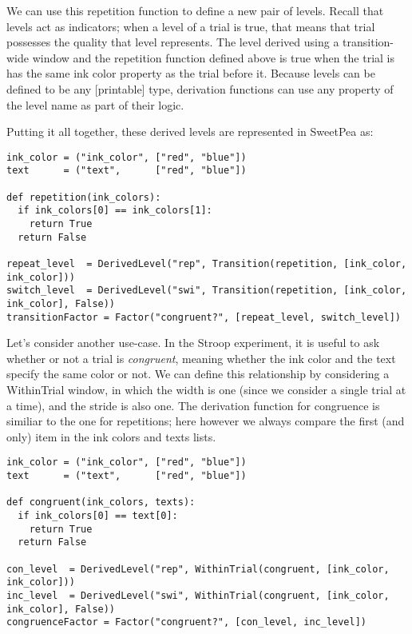 We can use this repetition function to define a new pair of levels. Recall that levels act as indicators; when a level of a trial is true, that means that trial possesses the quality that level represents. The level derived using a transition-wide window and the repetition function defined above is true when the trial is has the same ink color property as the trial before it. Because levels can be defined to be any [printable] type, derivation functions can use any property of the level name as part of their logic.

Putting it all together, these derived levels are represented in SweetPea as:

\begin{lstlisting}
ink_color = ("ink_color", ["red", "blue"])
text      = ("text",      ["red", "blue"])

def repetition(ink_colors):
  if ink_colors[0] == ink_colors[1]:
    return True
  return False

repeat_level  = DerivedLevel("rep", Transition(repetition, [ink_color, ink_color]))
switch_level  = DerivedLevel("swi", Transition(repetition, [ink_color, ink_color], False))
transitionFactor = Factor("congruent?", [repeat_level, switch_level])

\end{lstlisting}

Let's consider another use-case. In the Stroop experiment, it is useful to ask whether or not a trial is \emph{congruent}, meaning whether the ink color and the text specify the same color or not. We can define this relationship by considering a WithinTrial window, in which the width is one (since we consider a single trial at a time), and the stride is also one. The derivation function for congruence is similiar to the one for repetitions; here however we always compare the first (and only) item in the ink colors and texts lists.

\begin{lstlisting}
ink_color = ("ink_color", ["red", "blue"])
text      = ("text",      ["red", "blue"])

def congruent(ink_colors, texts):
  if ink_colors[0] == text[0]:
    return True
  return False

con_level  = DerivedLevel("rep", WithinTrial(congruent, [ink_color, ink_color]))
inc_level  = DerivedLevel("swi", WithinTrial(congruent, [ink_color, ink_color], False))
congruenceFactor = Factor("congruent?", [con_level, inc_level])

\end{lstlisting}

